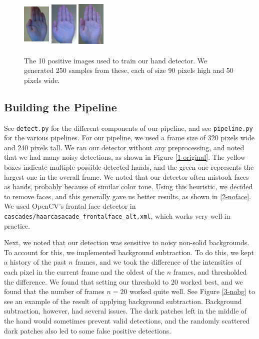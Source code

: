 \documentclass[12pt]{article}
\begin{document}
\begin{figure}[H]
\includegraphics[width=50px, height=90px]{../data/positives/img0007.jpg}
\includegraphics[width=50px, height=90px]{../data/positives/img0008.jpg}
\includegraphics[width=50px, height=90px]{../data/positives/img0009.jpg}
\caption{The 10 positive images used to train our hand detector. We generated 250 samples from these, each of size 90 pixels high and 50 pixels wide.}
\label{traininghands}
\end{figure}

\subsection{Building the Pipeline}

See \texttt{detect.py} for the different components of our pipeline, and see \texttt{pipeline.py} for the various pipelines. For our pipeline, we used a frame size of 320 pixels wide and 240 pixels tall. We ran our detector without any preprocessing, and noted that we had many noisy detections, as shown in Figure \ref{1-original}. The yellow boxes indicate multiple possible detected hands, and the green one represents the largest one in the overall frame. We noted that our detector often mistook faces as hands, probably because of similar color tone. Using this heuristic, we decided to remove faces, and this generally gave us better results, as shown in \ref{2-noface}. We used OpenCV's frontal face detector in \texttt{cascades/haarcasacade\_frontalface\_alt.xml}, which works very well in practice.

Next, we noted that our detection was sensitive to noisy non-solid backgrounds. To account for this, we implemented background subtraction. To do this, we kept a history of the past $n$ frames, and we took the difference of the intensities of each pixel in the current frame and the oldest of the $n$ frames, and thresholded the difference. We found that setting our threshold to $20$ worked best, and we found that the number of frames $n = 20$ worked quite well. See Figure \ref{3-nobg} to see an example of the result of applying background subtraction. Background subtraction, however, had several issues. The dark patches left in the middle of the hand would sometimes prevent valid detections, and the randomly scattered dark patches also led to some false positive detections. 
\end{document}
